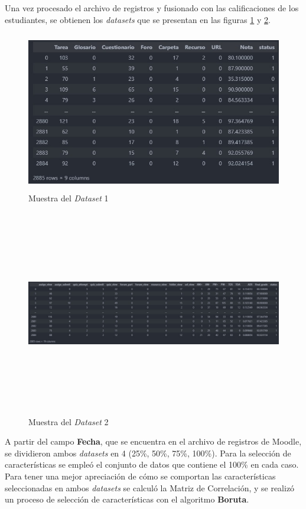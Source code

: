 Una vez procesado el archivo de registros y fusionado con las calificaciones de los estudiantes, se obtienen los \textit{datasets} que se presentan en las figuras \ref{dataset1_view} y \ref{dataset2_view}.  

\begin{figure}[htb]
    \centering
    \includegraphics[height=7cm, width=\textwidth]{Graphics/dataset1_view.jpg}
    \caption{Muestra del \textit{Dataset} 1}
    \label{dataset1_view}
\end{figure}

\newpage
\begin{figure}[htb]
    \centering
    \includegraphics[height=9cm, width = 1 \textwidth]{Graphics/dataset2_view.jpg}
    \caption{Muestra del \textit{Dataset} 2}
    \label{dataset2_view}
\end{figure}  


A partir del campo \textbf{Fecha}, que se encuentra en el archivo de registros de Moodle, se dividieron ambos \textit{datasets} en 4 (25\%, 50\%, 75\%, 100\%). Para la selección de características 
se empleó el conjunto de datos que contiene el 100\% en cada caso. Para tener una mejor apreciación de cómo se comportan las características seleccionadas en ambos \textit{datasets} se calculó la 
Matriz de Correlación, y se realizó un proceso de selección de características con el algoritmo \textbf{Boruta}.  

